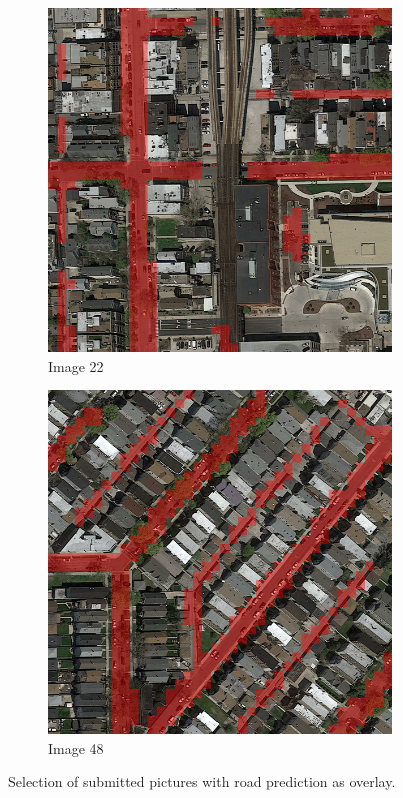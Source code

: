 \documentclass[10pt,conference,compsocconf]{IEEEtran}
\begin{document}
\begin{figure}
    \begin{subfigure}[b]{0.45\columnwidth}
      \includegraphics[width=\columnwidth]{figures/submission_selection/images_022.png}
      \caption{Image 22}\label{fig:sub_c}
    \end{subfigure}
    \begin{subfigure}[b]{0.45\columnwidth}
      \includegraphics[width=\columnwidth]{figures/submission_selection/images_048.png}
      \caption{Image 48}\label{fig:sub_d}
    \end{subfigure}

\caption{Selection of submitted pictures with road prediction as overlay.}\label{fig:submission}
\end{figure}
\end{document}
